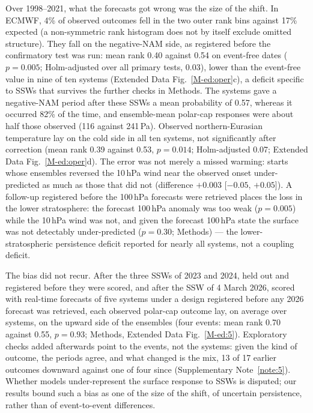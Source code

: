 \documentclass[11pt]{article}
\begin{document}
Over 1998–2021, what the forecasts got wrong was the size of the shift. In ECMWF, 4\% of observed outcomes fell in the two outer rank bins against 17\% expected (a non-symmetric rank histogram does not by itself exclude omitted structure). They fall on the negative-NAM side, as registered before the confirmatory test was run: mean rank 0.40 against 0.54 on event-free dates ($p = 0.005$; Holm-adjusted over all primary tests, 0.03), lower than the event-free value in nine of ten systems (Extended Data Fig.~\ref{M-ed:oper}c), a deficit specific to SSWs that survives the further checks in Methods. The systems gave a negative-NAM period after these SSWs a mean probability of 0.57, whereas it occurred 82\% of the time, and ensemble-mean polar-cap responses were about half those observed (116 against 241\,Pa). Observed northern-Eurasian temperature lay on the cold side in all ten systems, not significantly after correction (mean rank 0.39 against 0.53, $p = 0.014$; Holm-adjusted 0.07; Extended Data Fig.~\ref{M-ed:oper}d). The error was not merely a missed warming: starts whose ensembles reversed the 10\,hPa wind near the observed onset under-predicted as much as those that did not (difference $+0.003$ [$-0.05$, $+0.05$]). A follow-up registered before the 100\,hPa forecasts were retrieved places the loss in the lower stratosphere: the forecast 100\,hPa anomaly was too weak ($p = 0.005$) while the 10\,hPa wind was not, and given the forecast 100\,hPa state the surface was not detectably under-predicted ($p = 0.30$; Methods) — the lower-stratospheric persistence deficit reported for nearly all systems\cite{garfinkel25}, not a coupling deficit.

The bias did not recur. After the three SSWs of 2023 and 2024, held out and registered before they were scored, and after the SSW of 4 March 2026, scored with real-time forecasts of five systems under a design registered before any 2026 forecast was retrieved, each observed polar-cap outcome lay, on average over systems, on the upward side of the ensembles (four events: mean rank 0.70 against 0.55, $p = 0.93$; Methods, Extended Data Fig.~\ref{M-ed:5}). Exploratory checks added afterwards point to the events, not the systems: given the kind of outcome, the periods agree, and what changed is the mix, 13 of 17 earlier outcomes downward against one of four since (Supplementary Note~\ref{note:5}). Whether models under-represent the surface response to SSWs is disputed\cite{sigmond13,kolstad20,afargan24,dai25}; our results bound such a bias as one of the size of the shift, of uncertain persistence, rather than of event-to-event differences.
\end{document}
